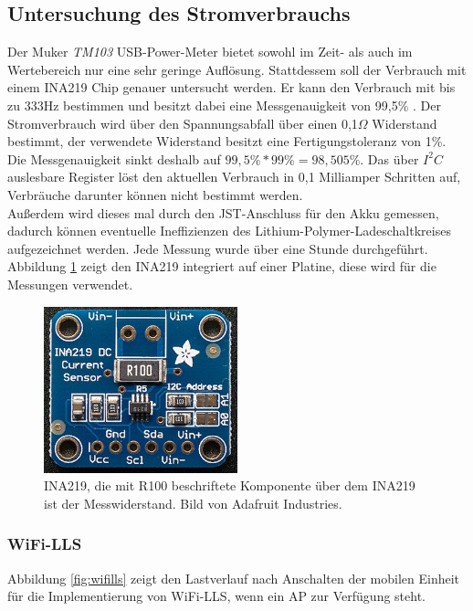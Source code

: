 \subsection{Untersuchung des Stromverbrauchs}
\label{ch:phase1:sec:energie}
Der Muker \emph{TM103} USB-Power-Meter bietet sowohl im Zeit- als auch im Wertebereich nur eine sehr geringe Auflösung.
Stattdessem soll der Verbrauch mit einem INA219 Chip genauer untersucht werden.
Er kann den Verbrauch mit bis zu 333Hz bestimmen und besitzt dabei eine Messgenauigkeit von 99,5\% \cite{texas2015ina}.
Der Stromverbrauch wird über den Spannungsabfall über einen 0,1$\Omega$ Widerstand bestimmt, der verwendete Widerstand besitzt eine Fertigungstoleranz von 1\%.
Die Messgenauigkeit sinkt deshalb auf $99,5\% * 99\% = 98,505\%$. 
Das über $I^2C$ auslesbare Register löst den aktuellen Verbrauch in 0,1 Milliamper Schritten auf, Verbräuche darunter können nicht bestimmt werden.\\
Außerdem wird dieses mal durch den JST-Anschluss für den Akku gemessen, dadurch können eventuelle Ineffizienzen des Lithium-Polymer-Ladeschaltkreises aufgezeichnet werden. 
Jede Messung wurde über eine Stunde durchgeführt.
Abbildung \ref{fig:ina219} zeigt den INA219 integriert auf einer Platine, diese wird für die Messungen verwendet.

\begin{figure}[h!]
  \centering
	\includegraphics[width=0.5\textwidth]{images/ina219ada.png}
  \caption{INA219, die mit R100 beschriftete Komponente über dem INA219 ist der Messwiderstand. Bild von Adafruit Industries\protect \footnotemark.}
  \label{fig:ina219}
\end{figure}

\subsubsection{WiFi-LLS}
\label{ch:phase1:sec:powerwifills}
Abbildung \ref{fig:wifills} zeigt den Lastverlauf nach Anschalten der mobilen Einheit für die Implementierung von WiFi-LLS, wenn ein AP zur Verfügung steht. 

